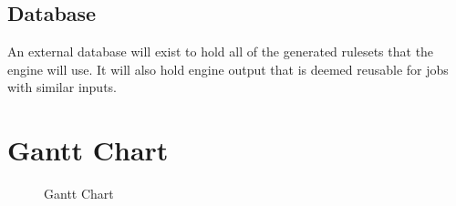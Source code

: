 \documentclass[onecolumn, draftclsnofoot,10pt, compsoc]{IEEEtran}
\begin{document}
\subsection{Database}
An external database will exist to hold all of the generated rulesets that the engine will use. It will also hold engine output that is deemed reusable for jobs with similar inputs.



\pagebreak
\section{Gantt Chart}
\begin{figure}[h]
    \caption{Gantt Chart}
    \label{fig:1}
\end{figure}
\end{document}
